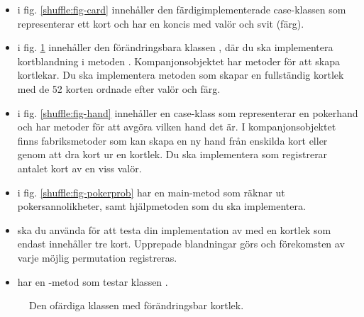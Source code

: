 \begin{itemize}
\item {} i fig. \ref{shuffle:fig-card} innehåller den färdigimplementerade case-klassen  som representerar ett kort och har en koncis  med valör och svit (färg).

\item {} i fig. \ref{shuffle:fig-deck} innehåller den förändringsbara klassen , där du ska implementera kortblandning i metoden . Kompanjonsobjektet har metoder för att skapa kortlekar. Du ska implementera metoden  som skapar en fullständig kortlek med de 52 korten ordnade efter valör och färg.

\item {} i fig. \ref{shuffle:fig-hand} innehåller en case-klass  som representerar en pokerhand och har metoder för att avgöra vilken hand det är. I kompanjonsobjektet finns fabriksmetoder som kan skapa en ny hand från enskilda kort eller genom att dra kort ur en kortlek. Du ska implementera  som registrerar antalet kort av en viss valör.

\item {} i fig. \ref{shuffle:fig-pokerprob}  har en main-metod som räknar ut pokersannolikheter, samt hjälpmetoden  som du ska implementera.

\item {} ska du använda för att testa din implementation av  med en kortlek som endast innehåller tre kort. Upprepade blandningar görs och förekomsten av varje möjlig permutation  registreras.

\item {} har en -metod som testar klassen .

\end{itemize}

\begin{figure}
\caption{Den ofärdiga klassen  med förändringsbar kortlek.}
\label{shuffle:fig-deck}
\end{figure}



